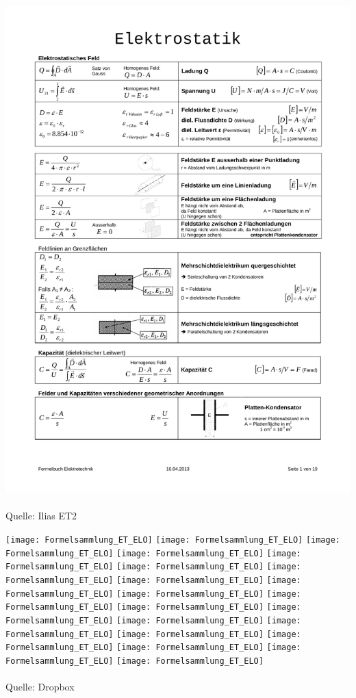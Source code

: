 \includegraphics[page=19,scale=0.57,trim=20mm 20mm 20mm 20mm]{ET-Formelsammlung}
\\
\\
Quelle: Ilias ET2

\texttt{[image: Formelsammlung\_ET\_ELO]}\newpage
\texttt{[image: Formelsammlung\_ET\_ELO]}\newpage
\texttt{[image: Formelsammlung\_ET\_ELO]}\newpage
\texttt{[image: Formelsammlung\_ET\_ELO]}\newpage
\texttt{[image: Formelsammlung\_ET\_ELO]}\newpage
\texttt{[image: Formelsammlung\_ET\_ELO]}\newpage
\texttt{[image: Formelsammlung\_ET\_ELO]}\newpage
\texttt{[image: Formelsammlung\_ET\_ELO]}\newpage
\texttt{[image: Formelsammlung\_ET\_ELO]}\newpage
\texttt{[image: Formelsammlung\_ET\_ELO]}\newpage
\texttt{[image: Formelsammlung\_ET\_ELO]}\newpage
\texttt{[image: Formelsammlung\_ET\_ELO]}\newpage
\texttt{[image: Formelsammlung\_ET\_ELO]}\newpage
\texttt{[image: Formelsammlung\_ET\_ELO]}\newpage
\texttt{[image: Formelsammlung\_ET\_ELO]}\newpage
\texttt{[image: Formelsammlung\_ET\_ELO]}\newpage
\texttt{[image: Formelsammlung\_ET\_ELO]}\newpage
\texttt{[image: Formelsammlung\_ET\_ELO]}\newpage
\texttt{[image: Formelsammlung\_ET\_ELO]}\newpage
\texttt{[image: Formelsammlung\_ET\_ELO]}
\\
\\
Quelle: Dropbox

